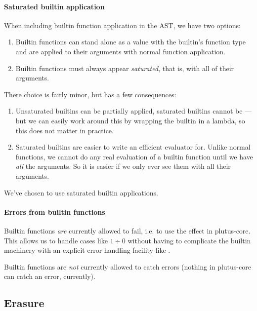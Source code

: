 \paragraph{Saturated builtin application}

When including builtin function application in the AST, we have two options:
\begin{enumerate}
\item
  Builtin functions can stand alone as a value with the builtin's function type and are applied to their arguments with normal function application.
\item
  Builtin functions must always appear \emph{saturated}, that is, with all of their arguments.
\end{enumerate}

There choice is fairly minor, but has a few consequences:
\begin{enumerate}
\item
  Unsaturated builtins can be partially applied, saturated builtins cannot be --- but we can easily work around this by wrapping the builtin in a lambda, so this does not matter in practice.
\item
  Saturated builtins are easier to write an efficient evaluator for.
  Unlike normal functions, we cannot do any real evaluation of a builtin function until we have \emph{all} the arguments.
  So it is easier if we only ever see them with all their arguments.
\end{enumerate}

We've chosen to use saturated builtin applications.

\paragraph{Errors from builtin functions}

Builtin functions \emph{are} currently allowed to fail, i.e. to use the  effect in \gls{plutus-core}.
This allows us to handle cases like $1 \div 0$ without having to complicate the builtin machinery with an explicit error handling facility like .

Builtin functions are \emph{not} currently allowed to catch errors (nothing in \gls{plutus-core} can catch an error, currently).

\subsection{Erasure}
\label{sec:erasure}

